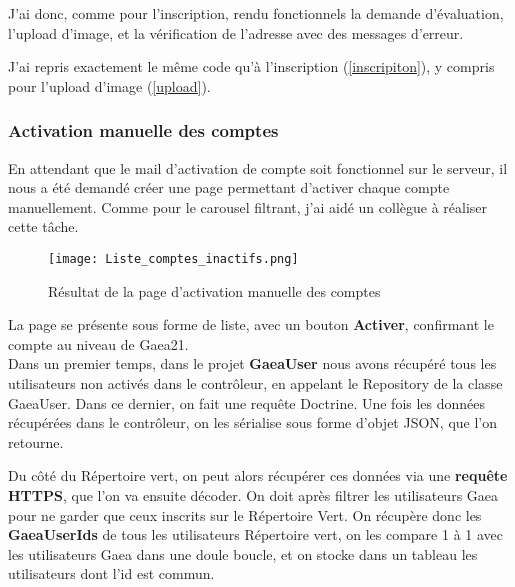 J'ai donc, comme pour l'inscription, rendu fonctionnels la demande d'évaluation, l'upload d'image, et la vérification de l'adresse avec des messages d'erreur.

J'ai repris exactement le même code qu'à l'inscription (\ref{inscripiton}), y compris pour l'upload d'image (\ref{upload}). 

\subsubsection{Activation manuelle des comptes}



En attendant que le mail d'activation de compte soit fonctionnel sur le serveur, il nous a été demandé créer une page permettant d'activer chaque compte manuellement.
Comme pour le carousel filtrant, j'ai aidé un collègue à réaliser cette tâche.

\begin{figure}[H]
    \texttt{[image: Liste\_comptes\_inactifs.png]}
    \caption{Résultat de la page d'activation manuelle des comptes}
\end{figure}

La page se présente sous forme de liste, avec un bouton \textbf{Activer}, confirmant le compte au niveau de Gaea21.\\

Dans un premier temps, dans le projet \textbf{GaeaUser} nous avons récupéré tous les utilisateurs non activés dans le contrôleur, en appelant le Repository de la classe GaeaUser. 
Dans ce dernier, on fait une requête Doctrine. Une fois les données récupérées dans le contrôleur, on les sérialise sous forme d'objet JSON, que l'on retourne.

Du côté du Répertoire vert, on peut alors récupérer ces données via une \textbf{requête HTTPS}, que l'on va ensuite décoder. 
On doit après filtrer les utilisateurs Gaea pour ne garder que ceux inscrits sur le Répertoire Vert. On récupère donc les \textbf{GaeaUserIds} de tous les utilisateurs Répertoire vert, on les compare 1 à 1 avec les utilisateurs Gaea dans une doule boucle, et on stocke dans un tableau les utilisateurs dont l'id est commun.\\

